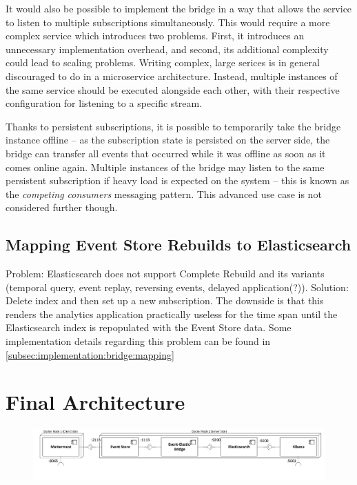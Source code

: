 It would also be possible to implement the bridge in a way that allows the service to listen to multiple subscriptions simultaneously.
This would require a more complex service which introduces two problems.
First, it introduces an unnecessary implementation overhead, and second, its additional complexity could lead to scaling problems.
Writing complex, large serices is in general discouraged to do in a microservice architecture\cite[Key Benefits,pp.~5f]{newman2015building}.
Instead, multiple instances of the same service should be executed alongside each other, with their respective configuration for listening to a specific stream.

Thanks to persistent subscriptions, it is possible to temporarily take the bridge instance offline -- as the subscription state is persisted on the server side, the bridge can transfer all events that occurred while it was offline as soon as it comes online again.
Multiple instances of the bridge may listen to the same persistent subscription if heavy load is expected on the system -- this is known as the \emph{competing consumers} messaging pattern\cite{WEB:Microsoft-Competing-Consumers}.
This advanced use case is not considered further though.

\subsection{Mapping Event Store Rebuilds to Elasticsearch}
\label{subsec:design:bridge:mapping}

Problem: Elasticsearch does not support Complete Rebuild and its variants (temporal query, event replay, reversing events, delayed application(?)).
Solution: Delete index and then set up a new subscription.
The downside is that this renders the analytics application practically useless for the time span until the Elasticsearch index is repopulated with the Event Store data.
Some implementation details regarding this problem can be found in \cref{subsec:implementation:bridge:mapping}

\section{Final Architecture}

\begin{figure}[htb]
        \includegraphics[width=\textwidth]{gfx/docker-architecture}
        \caption{}
        \label{}
\end{figure}





































